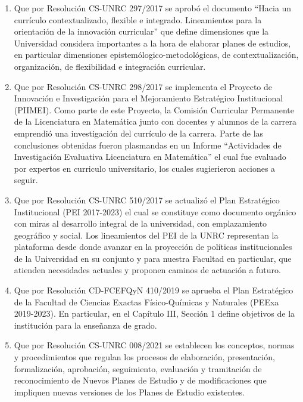 \documentclass[a4paper, 12pt]{article}
\begin{document}
\begin{enumerate}
 \item Que por Resolución CS-UNRC 297/2017 se aprobó el documento ``Hacia   un   currículo contextualizado, flexible e integrado. Lineamientos para la orientación de la innovación  curricular'' que define dimensiones que la Universidad considera importantes a la hora de elaborar planes de estudios, en particular dimensiones epistemólogico-metodológicas, de contextualización, organización, de flexibilidad e integración curricular. 

 \item Que por Resolución CS-UNRC 298/2017 se implementa el Proyecto de Innovación e Investigación para el Mejoramiento Estratégico Institucional (PIIMEI). Como parte de este Proyecto, la Comisión Curricular Permanente de la Licenciatura en Matemática junto con docentes y alumnos de la carrera emprendió una investigación del currículo de la carrera.  Parte de las conclusiones obtenidas fueron plasmandas en un Informe ``Actividades de Investigación Evaluativa
Licenciatura en Matemática'' el cual fue evaluado por expertos en curriculo universitario, los cuales sugierieron acciones a seguir.
\item Que por Resolución CS-UNRC 510/2017 se actualizó el Plan Estratégico Institucional (PEI 2017-2023) el cual se constituye como documento orgánico con miras al desarrollo integral de la universidad, con emplazamiento geográfico y social. Los lineamientos del PEI de la UNRC representan la plataforma desde donde avanzar en la proyección de políticas institucionales de la Universidad en su conjunto y para nuestra Facultad en particular, que atienden necesidades actuales y proponen caminos de actuación a futuro.
\item Que por Resolución CD-FCEFQyN 410/2019 se aprueba el Plan Estratégico de la Facultad de Ciencias Exactas Físico-Químicas y Naturales (PEExa 2019-2023). En particular, en el Capítulo III, Sección 1 define objetivos de la institución para la enseñanza de grado.   

 \item Que por Resolución CS-UNRC 008/2021 se establecen los conceptos, normas y procedimientos que regulan los procesos de elaboración, presentación, formalización, aprobación, seguimiento, evaluación y tramitación de reconocimiento de Nuevos Planes de Estudio y de modificaciones que impliquen nuevas versiones de los Planes de Estudio existentes.

\end{enumerate}
\end{document}
